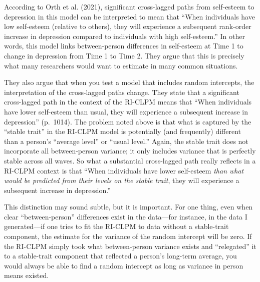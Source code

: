 \documentclass[
  english,
  man,floatsintext]{apa6}
\begin{document}
According to Orth et al. (2021), significant cross-lagged paths from self-esteem to depression in this model can be interpreted to mean that ``When individuals have low self-esteem (relative to others), they will experience a subsequent rank-order increase in depression compared to individuals with high self-esteem.'' In other words, this model links between-person differences in self-esteem at Time 1 to change in depression from Time 1 to Time 2. They argue that this is precisely what many researchers would want to estimate in many common situations.

They also argue that when you test a model that includes random intercepts, the interpretation of the cross-lagged paths change. They state that a significant cross-lagged path in the context of the RI-CLPM means that ``When individuals have lower self-esteem than usual, they will experience a subsequent increase in depression'' (p.~1014). The problem noted above is that what is captured by the ``stable trait'' in the RI-CLPM model is potentially (and frequently) different than a person's ``average level'' or ``usual level.'' Again, the stable trait does not incorporate all between-person variance; it only includes variance that is perfectly stable across all waves. So what a substantial cross-lagged path really reflects in a RI-CLPM context is that ``When individuals have lower self-esteem \emph{than what would be predicted from their levels on the stable trait}, they will experience a subsequent increase in depression.''

This distinction may sound subtle, but it is important. For one thing, even when clear ``between-person'' differences exist in the data---for instance, in the data I generated---if one tries to fit the RI-CLPM to data without a stable-trait component, the estimate for the variance of the random intercept will be zero. If the RI-CLPM simply took what between-person variance exists and ``relegated'' it to a stable-trait component that reflected a person's long-term average, you would always be able to find a random intercept as long as variance in person means existed.
\end{document}
